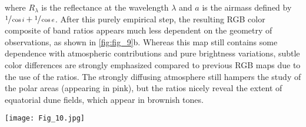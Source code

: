 \documentclass[preprint,twocolumn,5p,authoryear,compress,colorlinks=true]{elsarticle}
\newcommand{\figref}[1]{\autoref{fig:#1}}
\begin{document}
{where $R_\lambda$ is the reflectance at the wavelength $\lambda$ and $a$ is the airmass defined by $\sfrac{1}{\cos i} + \sfrac{1}{\cos e}$. After this purely empirical step, the resulting RGB color composite of band ratios appears much less dependent on the geometry of observations, as shown in \figref{fig_9}b. Whereas this map still contains some dependence with atmospheric contributions and pure brightness variations, subtle color differences are strongly emphasized compared to previous RGB maps due to the use of the ratios. The strongly diffusing atmosphere still hampers the study of the polar areas (appearing in pink), but the ratios nicely reveal the extent of equatorial dune fields, which appear in brownish tones.

\begin{figure*}[!ht]
 \texttt{[image: Fig\_10.jpg]}
 \caption{Selection of orthographic views derived from the RGB corrected color ratio map of \figref{fig_9}b after a last cosmetic hand cleaning step. The upper left image is centered at (\ang{0}, \ang{170}E), close to the Huygens landing site. The six panels correspond to views where Titan is rotated by 60 deg. in longitude eastward from left to right and from top to bottom. The equatorial dune fields appear readily in brown. Bright terrains and several patches of bluish areas also show up in specific locations.}
 \label{fig:fig_10}
\end{figure*}

}
\end{document}

